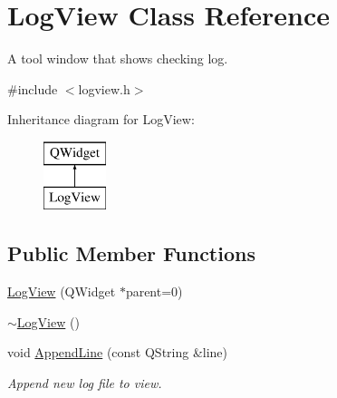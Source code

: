 \hypertarget{class_log_view}{\section{Log\-View Class Reference}
\label{class_log_view}
}


A tool window that shows checking log.  




{\ttfamily \#include $<$logview.\-h$>$}

Inheritance diagram for Log\-View\-:\begin{figure}[H]
\begin{center}
\leavevmode
\includegraphics[height=2.000000cm]{class_log_view}
\end{center}
\end{figure}
\subsection*{Public Member Functions}
\begin{DoxyCompactItemize}
\item 
\hyperlink{class_log_view_ac1c14e6db9a4d3ed82a183ad1411b032}{Log\-View} (Q\-Widget $\ast$parent=0)
\item 
\hyperlink{class_log_view_a09bd9b2d7c2b955bf092ef10bc20326f}{$\sim$\-Log\-View} ()
\item 
void \hyperlink{class_log_view_a7c65dcafa64a384d9cc2891c666af185}{Append\-Line} (const Q\-String \&line)
\begin{DoxyCompactList}\small\item\em Append new log file to view. \end{DoxyCompactList}\end{DoxyCompactItemize}
